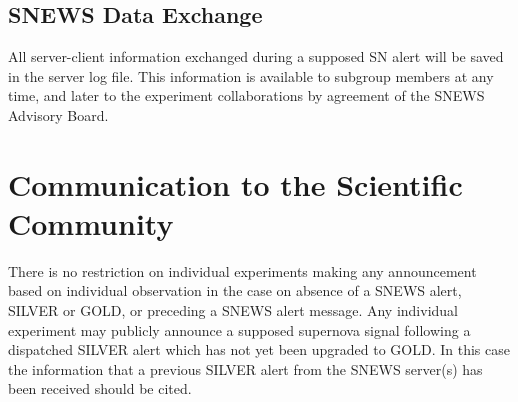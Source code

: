 \documentclass{article}
\begin{document}
\subsection{SNEWS Data Exchange}

All server-client information
exchanged during a supposed SN alert will be saved
in the server log file. This information is available to subgroup
members at any time, and later to the experiment collaborations
by agreement of the SNEWS Advisory Board.



\section{Communication to the Scientific Community}
There is no restriction on individual experiments making any announcement
based on individual observation in the case on absence of a SNEWS
alert, SILVER or GOLD, or preceding a SNEWS alert message.  
Any individual experiment may
publicly announce a supposed supernova signal following a dispatched 
SILVER alert which has not yet been upgraded to GOLD.  In this case 
the information that a previous SILVER alert from the
SNEWS server(s) has been received should be cited.
                                         
\end{document}
